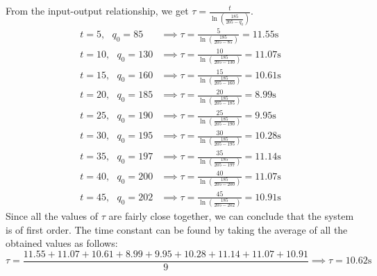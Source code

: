 \documentclass[a4paper, 11pt]{article}
\begin{document}
\begin{enumerate}[label=(\arabic*),leftmargin=*]
From the input-output relationship, we get $\displaystyle \tau=\frac{t}{\ln\left(\frac{185}{205-q_0}\right)}$.
\begin{align*}
	t=5,\text{ }q_0=85&\implies\tau=\frac{5}{\ln\left(\frac{185}{205-85}\right)}=11.55\text{s}\\
	t=10,\text{ }q_0=130&\implies\tau=\frac{10}{\ln\left(\frac{185}{205-130}\right)}=11.07\text{s}\\
	t=15,\text{ }q_0=160&\implies\tau=\frac{15}{\ln\left(\frac{185}{205-160}\right)}=10.61\text{s}\\
	t=20,\text{ }q_0=185&\implies\tau=\frac{20}{\ln\left(\frac{185}{205-185}\right)}=8.99\text{s}\\
	t=25,\text{ }q_0=190&\implies\tau=\frac{25}{\ln\left(\frac{185}{205-190}\right)}=9.95\text{s}\\
	t=30,\text{ }q_0=195&\implies\tau=\frac{30}{\ln\left(\frac{185}{205-195}\right)}=10.28\text{s}\\
	t=35,\text{ }q_0=197&\implies\tau=\frac{35}{\ln\left(\frac{185}{205-197}\right)}=11.14\text{s}\\
	t=40,\text{ }q_0=200&\implies\tau=\frac{40}{\ln\left(\frac{185}{205-200}\right)}=11.07\text{s}\\
	t=45,\text{ }q_0=202&\implies\tau=\frac{45}{\ln\left(\frac{185}{205-202}\right)}=10.91\text{s}
\end{align*}
Since all the values of $\tau$ are fairly close together, we can conclude that the system is of first order. The time constant can be found by taking the average of all the obtained values as follows:
$$\tau=\frac{11.55+11.07+10.61+8.99+9.95+10.28+11.14+11.07+10.91}{9}\implies\boxed{\tau=10.62\text{s}}$$
\end{enumerate}
\end{document}
